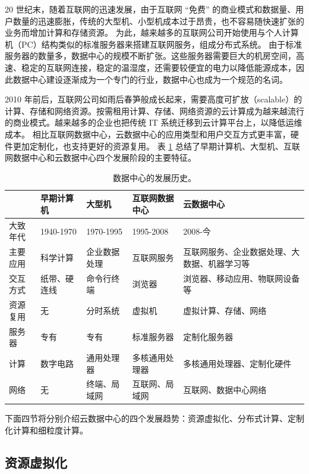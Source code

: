 20 世纪末，随着互联网的迅速发展，由于互联网 ``免费'' 的商业模式和数据量、用户数量的迅速膨胀，传统的大型机、小型机成本过于昂贵，也不容易随快速扩张的业务而增加计算和存储资源。
为此，越来越多的互联网公司开始使用与个人计算机（PC）结构类似的标准服务器来搭建互联网服务，组成分布式系统。
由于标准服务器的数量多，数据中心的规模不断扩张。这些服务器需要巨大的机房空间，高速、稳定的互联网连接，稳定的温湿度，还需要较便宜的电力以降低能源成本，因此数据中心建设逐渐成为一个专门的行业，数据中心也成为一个规范的名词。

2010 年前后，互联网公司如雨后春笋般成长起来，需要高度可扩放（scalable）的计算、存储和网络资源。按需租用计算、存储、网络资源的云计算成为越来越流行的商业模式。越来越多的企业也把传统 IT 系统迁移到云计算平台上，以降低运维成本。
相比互联网数据中心，云数据中心的应用类型和用户交互方式更丰富，硬件更加定制化，也支持更好的资源复用。
表 \ref{background:tab:datacenter} 总结了早期计算机、大型机、互联网数据中心和云数据中心四个发展阶段的主要特征。



\begin{table}[htbp]
	\centering
	\caption{数据中心的发展历史。}
	\small
	\begin{tabular}{l|p{}|p{}|p{}|p{}}
		\hline
		 & 早期计算机 & 大型机 & 互联网数据中心 & 云数据中心 \\
		\hline
		\hline
		大致年代 & 1940-1970 & 1970-1995 & 1995-2008 & 2008-今 \\
		\hline
		主要应用 & 科学计算 & 企业数据处理 & 互联网服务 & 互联网服务、企业数据处理、大数据、机器学习等 \\
		\hline
		交互方式 & 纸带、硬连线 & 命令行终端 & 浏览器 & 浏览器、移动应用、物联网设备等 \\
		\hline
		资源复用 & 无 & 分时系统 & 虚拟机 & 虚拟计算、存储、网络 \\
		\hline
		服务器 & 专有 & 专有 & 标准服务器 & 定制化服务器 \\
		\hline
		计算 & 数字电路 & 通用处理器 & 多核通用处理器 & 多核通用处理器、定制化硬件 \\
		\hline
		网络 & 无 & 终端、局域网 & 互联网、局域网 & 互联网、数据中心网络 \\
		\hline
	\end{tabular}
	\label{background:tab:datacenter}
\end{table}

下面四节将分别介绍云数据中心的四个发展趋势：资源虚拟化、分布式计算、定制化计算和细粒度计算。

\subsection{资源虚拟化}
\label{background:sec:datacenter-virtualization}

